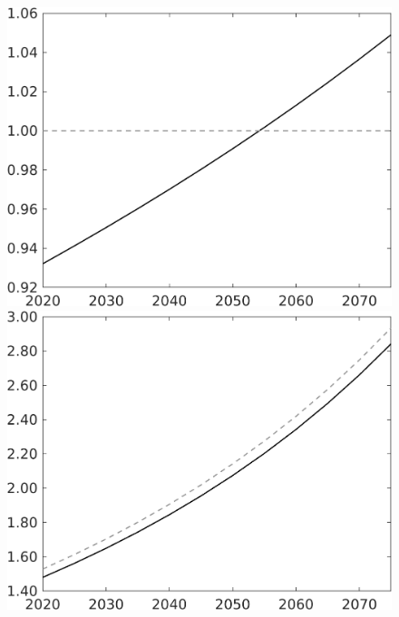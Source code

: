 \documentclass[12pt]{article}
\begin{document}
\begin{figure}[h!!]
\begin{minipage}[]{0.32\textwidth}
	\end{minipage}	
	\begin{minipage}[]{0.32\textwidth}
		\includegraphics[width=1\textwidth]{../../codding_model/own_basedOnFried/optimalPol_010922_revision/figures/all_13Sept22/CompTaul_LFBAU_Reg0_lambdaa_spillover0_nsk0_xgr1_knspil0_sep1_countec0_GovRev0_etaa0.79_lgd0.png}
	\end{minipage}	
	\begin{minipage}[]{0.32\textwidth}
		\includegraphics[width=1\textwidth]{../../codding_model/own_basedOnFried/optimalPol_010922_revision/figures/all_13Sept22/CompTaul_LFBAU_Reg0_wl_spillover0_nsk0_xgr1_knspil0_sep1_countec0_GovRev0_etaa0.79_lgd0.png}

\end{minipage}
\end{figure}
\end{document}
